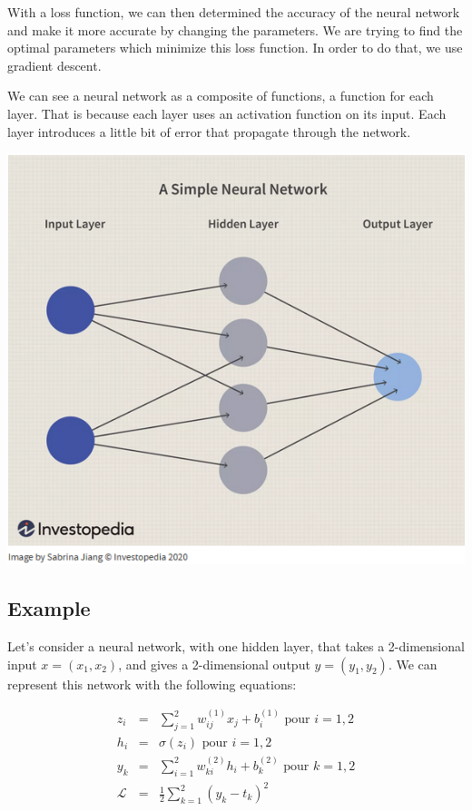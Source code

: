 \documentclass[10pt,a4paper]{article}
\theoremstyle{definition}
\theoremstyle{definition}
\begin{document}
With a loss function, we can then determined the accuracy of the neural network and make it more accurate by changing the parameters. We are trying to find the optimal parameters which minimize this loss function. In order to do that, we use gradient descent.

We can see a neural network as a composite of functions, a function for each layer. That is because each layer uses an activation function on its input. Each layer introduces a little bit of error that propagate through the network.

\begin{center}
\includegraphics[scale=0.55]{nn.png}
\end{center}  

\subsection{Example} \label{2.1}

Let's consider a neural network, with one hidden layer, that takes a 2-dimensional input $x = (x_1, x_2)$, and gives a 2-dimensional output $y = (y_1,y_2)$. We can represent this network with the following equations:

   \begin{eqnarray}
   \nonumber
   z_i & = & \sum_{j=1}^2 w_{ij}^{(1)}x_j + b_i^{(1)} \text{ pour } i = 1,2 \\ 
   \nonumber
   h_i & = & \sigma (z_i) \text{ pour } i=1,2 \\
   \nonumber
   y_k & = & \sum_{i=1}^2 w_{ki}^{(2)}h_i + b_k^{(2)} \text{ pour } k = 1,2 \\
   \nonumber
   \mathcal{L} & = & \frac{1}{2} \sum_{k = 1}^2 (y_k - t_k)^2
   \end{eqnarray}
   
\end{document}
